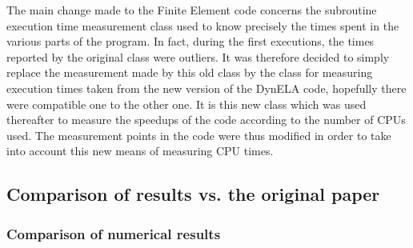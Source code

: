 \documentclass{article}
\begin{document}
The main change made to the Finite Element code concerns the subroutine execution time measurement class used to know precisely the times spent in the various parts of the program. In fact, during the first executions, the times reported by the original class were outliers. It was therefore decided to simply replace the measurement made by this old class by the class for measuring execution times taken from the new version of the DynELA code, hopefully there were compatible one to the other one. It is this new class which was used thereafter to measure the speedups of the code according to the number of CPUs used. The measurement points in the code were thus modified in order to take into account this new means of measuring CPU times.

\subsection{Comparison of results vs. the original paper}

\subsubsection{Comparison of numerical results}\label{Ptensile}
\end{document}

